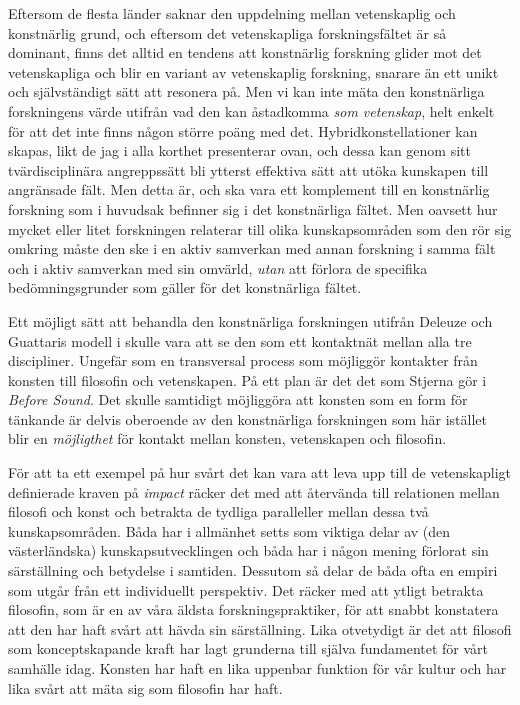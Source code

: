 \documentclass[11pt]{article}
\begin{document}
Eftersom de flesta länder saknar den uppdelning mellan vetenskaplig
och konstnärlig grund, och eftersom det vetenskapliga forskningsfältet
är så dominant, finns det alltid en tendens att konstnärlig forskning
glider mot det vetenskapliga och blir en variant av vetenskaplig
forskning, snarare än ett unikt och självständigt sätt att resonera på. Men vi kan inte
mäta den konstnärliga forskningens värde utifrån vad den kan
åstadkomma \emph{som vetenskap}, helt enkelt för att det inte finns
någon större poäng med det. Hybridkonstellationer kan skapas, likt de
jag i alla korthet presenterar ovan, och dessa kan genom sitt
tvärdisciplinära angreppssätt bli ytterst effektiva sätt att utöka
kunskapen till angränsade fält. Men detta är, och ska vara ett
komplement till en konstnärlig forskning som i huvudsak befinner sig i
det konstnärliga fältet. Men oavsett hur mycket eller litet forskningen relaterar till
olika kunskapsområden som den rör sig omkring måste den ske i en aktiv
samverkan med annan forskning i samma fält och i aktiv samverkan med
sin omvärld, \emph{utan} att förlora de specifika bedömningsgrunder som
gäller för det konstnärliga fältet.

Ett möjligt sätt att behandla den konstnärliga forskningen utifrån
Deleuze och Guattaris modell i  skulle vara att
se den som ett kontaktnät mellan alla tre discipliner. Ungefär som en
transversal process som möjliggör kontakter från konsten till
filosofin och vetenskapen. På ett plan är det det som Stjerna gör i
\emph{Before Sound}. Det skulle samtidigt möjliggöra att konsten som
en form för tänkande är delvis oberoende av den konstnärliga
forskningen som här istället blir en \emph{möjligthet} för kontakt
mellan konsten, vetenskapen och filosofin.

För att ta ett exempel på hur svårt det kan vara att leva upp till de
vetenskapligt definierade kraven på \emph{impact} räcker det med att
återvända till relationen mellan filosofi och konst och betrakta de
tydliga paralleller mellan dessa två kunskapsområden. Båda har i
allmänhet setts som viktiga delar av (den västerländska)
kunskapsutvecklingen och båda har i någon mening förlorat sin
särställning och betydelse i samtiden. Dessutom så delar de båda ofta
en empiri som utgår från ett individuellt perspektiv. Det räcker med
att ytligt betrakta filosofin, som är en av våra äldsta
forskningspraktiker, för att snabbt konstatera att den har haft svårt
att hävda sin särställning. Lika otvetydigt är det att filosofi som
konceptskapande kraft har lagt grunderna till själva fundamentet för
vårt samhälle idag. Konsten har haft en lika uppenbar funktion för vår
kultur och har lika svårt att mäta sig som filosofin har haft.  %
\end{document}
